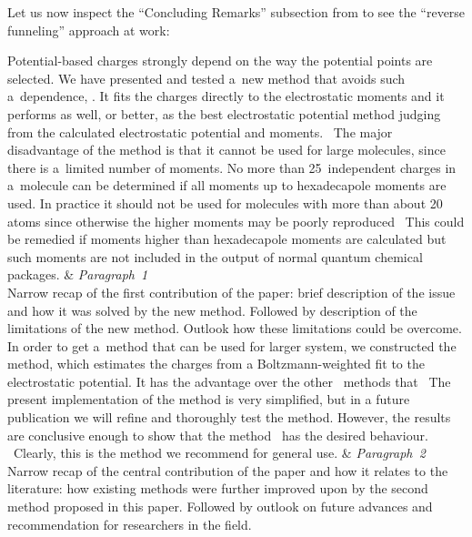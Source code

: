 \documentclass[12pt, a4paper, oneside]{article}
\newlength{\smalllinespacing}
\renewcommand{\caps}[1]{{\textscale{0.97}{\textls[50]{\MakeUppercase{#1}}}}}
\theoremstyle{Plain}
\theoremstyle{Definition}
\theoremstyle{Remark}
\begin{document}
Let us now inspect the ``Concluding Remarks'' subsection from \citet{sigfridsson} to see the ``reverse funneling'' approach at work:
\begin{tcolorbox}
	\begin{tblr}{}
		Potential-based charges strongly depend on the way the potential points are selected. We have presented and tested a~new method that avoids such a~dependence, \caps{CHELMO}. It fits the charges directly to the electrostatic moments and it performs as well, or better, as the best electrostatic potential method judging from the calculated electrostatic potential and moments. \textellipsis\ The major disadvantage of the method is that it cannot be used for large molecules, since there is a~limited number of moments. No more than 25~independent charges in a~molecule can be determined if all moments up to hexadecapole moments are used. In practice it should not be used for molecules with more than about 20 atoms since otherwise the higher moments may be poorly reproduced \textellipsis\ This could be remedied if moments higher than hexadecapole moments are calculated but such moments are not included in the output of normal quantum chemical packages.
		&
		{%
			\textit{Paragraph~1} \\
			Narrow recap of the first contribution of the paper: brief description of the issue and how it was solved by the new method. Followed by description of the limitations of the new method. Outlook how these limitations could be overcome.
		}
		\\
		\hspace{\smalllinespacing}In order to get a~method that can be used for larger system, we constructed the \caps{CHELP-BOW} method, which estimates the charges from a Boltzmann-weighted fit to the electrostatic potential. It has the advantage over the other \textellipsis\ methods that \textellipsis\ The present implementation of the \caps{CHELP-BOW} method is very simplified, but in a future publication we will refine and thoroughly test the method. However, the results are conclusive enough to show that the method \textellipsis\ has the desired behaviour. \textellipsis\ Clearly, this is the method we recommend for general use.
		&
		{%
			\textit{Paragraph~2} \\
			Narrow recap of the central contribution of the paper and how it relates to the literature: how existing methods were further improved upon by the second method proposed in this paper. Followed by outlook on future advances and recommendation for researchers in the field.
}
\end{tblr}
\end{tcolorbox}
\end{document}
